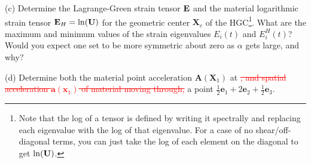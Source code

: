 \medskip
(c) Determine the Lagrange-Green strain tensor $\mathbf{E}$ and the material logarithmic strain tensor $\mathbf{E}_H = \ln (\mathbf{U})$ for the geometric center $\bm{X}_c$ of the HGC\footnote{Note that the log of a tensor is defined by writing it spectrally and replacing each eigenvalue with the log of that eigenvalue. For a case of no shear/off-diagonal terms, you can just take the log of each element on the diagonal to get $\ln(\mathbf{U})$.}. 
What are the maximum and minimum values of the strain eigenvalues $E_i(t)$ and $E_i^H(t)$? 
Would you expect one set to be more symmetric about zero as $\alpha$ gets large, and why?

\medskip
(d) Determine both the material point acceleration $\bm{A}(\bm{X}_1)$ at \textcolor{red}{\sout{, and spatial acceleration $\bm{a}(\bm{x}_1)$ of material moving through,}} a point $\frac{1}{2} \bm{e}_1 + 2\bm{e}_2 + \frac{1}{2} \bm{e}_3$.  

\begin{figure}
\centering
{}
\end{figure}

